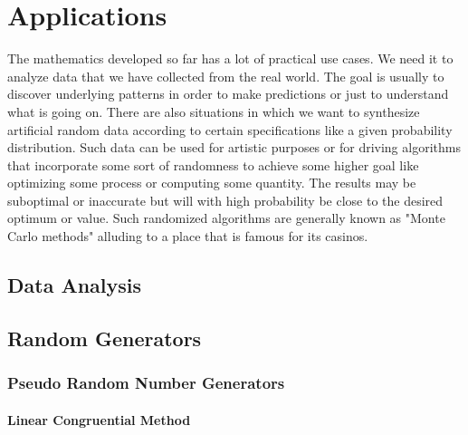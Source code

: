 \section{Applications}
The mathematics developed so far has a lot of practical use cases. We need it to analyze data that we have collected from the real world. The goal is usually to discover underlying patterns in order to make predictions or just to understand what is going on. There are also situations in which we want to synthesize artificial random data according to certain specifications like a given probability distribution. Such data can be used for artistic purposes or for driving algorithms that incorporate some sort of randomness to achieve some higher goal like optimizing some process or computing some quantity. The results may be suboptimal or inaccurate but will with high probability be close to the desired optimum or value. Such randomized algorithms are generally known as "Monte Carlo methods" alluding to a place that is famous for its casinos.



\subsection{Data Analysis}



\subsection{Random Generators}

\subsubsection{Pseudo Random Number Generators}

\paragraph{Linear Congruential Method}

